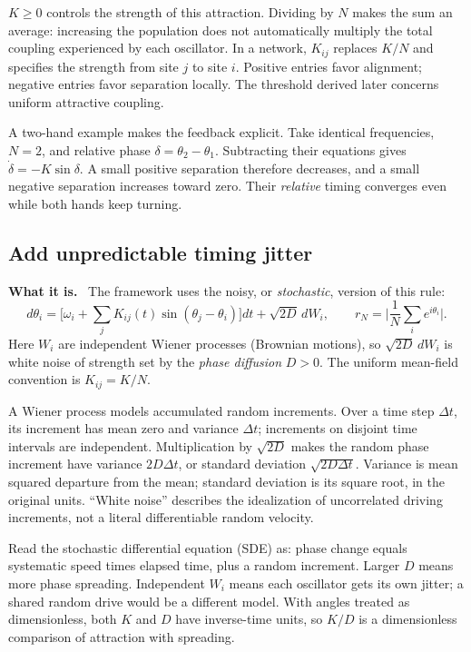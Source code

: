 \documentclass[11pt]{article}
\newcommand{\what}{\par\smallskip\noindent\textbf{What it is.}\ }
\begin{document}
$K\ge0$ controls the strength of this attraction. Dividing by $N$ makes the
sum an average: increasing the population does not automatically multiply the
total coupling experienced by each oscillator. In a network, $K_{ij}$ replaces
$K/N$ and specifies the strength from site $j$ to site $i$. Positive entries
favor alignment; negative entries favor separation locally. The threshold
derived later concerns uniform attractive coupling.

A two-hand example makes the feedback explicit. Take identical frequencies,
$N=2$, and relative phase $\delta=\theta_2-\theta_1$. Subtracting their
equations gives $\dot\delta=-K\sin\delta$. A small positive separation
therefore decreases, and a small negative separation increases toward zero.
Their \emph{relative} timing converges even while both hands keep turning.

\subsection{Add unpredictable timing jitter}

\what
The framework uses the noisy, or \emph{stochastic}, version of this rule:
\begin{equation}
 d\theta_i=\Big[\omega_i+\sum_j K_{ij}(t)\sin(\theta_j-\theta_i)\Big]dt
 +\sqrt{2D}\,dW_i ,
 \qquad
 r_N=\Big|\frac1N\sum_i e^{i\theta_i}\Big| .
 \label{eq:sde}
\end{equation}
Here $W_i$ are independent Wiener processes (Brownian motions), so
$\sqrt{2D}\,dW_i$ is white noise of strength set by the \emph{phase diffusion}
$D>0$. The uniform mean-field convention is $K_{ij}=K/N$.

A Wiener process models accumulated random increments. Over a time step
$\Delta t$, its increment has mean zero and variance $\Delta t$; increments
on disjoint time intervals are independent. Multiplication by $\sqrt{2D}$
makes the random phase increment have variance $2D\Delta t$, or standard
deviation $\sqrt{2D\Delta t}$. Variance is mean squared departure from the
mean; standard deviation is its square root, in the original units. ``White
noise'' describes the idealization of uncorrelated driving increments, not
a literal differentiable random velocity.

Read the stochastic differential equation (SDE) as: phase change equals
systematic speed times elapsed time, plus a random increment. Larger $D$
means more phase spreading. Independent $W_i$ means each oscillator gets its
own jitter; a shared random drive would be a different model. With angles
treated as dimensionless, both $K$ and $D$ have inverse-time units, so $K/D$
is a dimensionless comparison of attraction with spreading.
\end{document}
